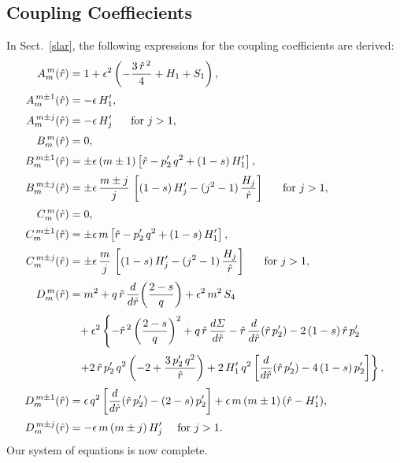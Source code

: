 \documentclass[12pt,prb,aps]{revtex4-1}
\begin{document}
\subsection{Coupling Coeffiecients}
In Sect.~\ref{slar}, the following expressions for the coupling coefficients are derived:
\begin{align}\label{c1}
A_m^{\,m}(\hat{r}) &= 1 + \epsilon^2\left(-\frac{3\,\hat{r}^{\,2}}{4} + H_1+S_1\right),\\[0.5ex]
A_m^{\,m\pm 1}(\hat{r}) &= - \epsilon\,H_1',\\[0.5ex]
A_m^{\,m\pm j}(\hat{r}) &= -\epsilon\,H_j'~~~~~\mbox{for $j>1$},\\[0.5ex]
B_m^{\,m}(\hat{r}) &= 0,\\[0.5ex]
B_m^{\,m\pm 1}(\hat{r}) &= \pm \epsilon\,(m\pm 1)\left[\hat{r}-p_2'\,q^2+(1-s)\,H_1'\right],\\[0.5ex]
B_m^{\,m\pm j}(\hat{r}) &= \pm\epsilon\,\frac{m\pm j}{j}\,\left[(1-s)\,H_j'- (j^2-1)\,\frac{H_j}{\hat{r}}\right]~~~~~\mbox{for $j>1$},\\[0.5ex]
C_m^{\,m}(\hat{r}) &= 0,\\[0.5ex]
C_m^{\,m\pm 1}(\hat{r}) &= \pm \epsilon\,m\left[\hat{r}-p_2'\,q^2+(1-s)\,H_1'\right],\\[0.5ex]
C_m^{\,m\pm j}(\hat{r}) &= \pm\epsilon\,\frac{m}{j}\,\left[(1-s)\,H_j'- (j^2-1)\,\frac{H_j}{\hat{r}}\right]~~~~~\mbox{for $j>1$},\\[0.5ex]
D_m^{\,m}(\hat{r}) &= m^2 + q\,\hat{r}\,\frac{d}{d\hat{r}}\!\left(\frac{2-s}{q}\right) +\epsilon^2\,m^2\,S_4\nonumber\\[0.5ex]
&\phantom{=}+\epsilon^2\left\{-\hat{r}^{\,2}\left(\frac{2-s}{q}\right)^2+q\,\hat{r}\,\frac{d{\mit\Sigma}}{d\hat{r}}- \hat{r}\,\frac{d}{d\hat{r}}(\hat{r}\,p_2') -2\,(1-s)\,\hat{r}\,p_2'
\right.\nonumber\\[0.5ex]
&\phantom{=}\left.+2\,\hat{r}\,p_2'\,q^2\left(-2 + \frac{3\,p_2'\,q^2}{\hat{r}}\right) + 2\,H_1'\,q^2\left[\frac{d}{d\hat{r}}(\hat{r}\,p_2')-4\,(1-s)\,p_2'\right]\right\},\\[0.5ex]
D_m^{\,m\pm 1}(\hat{r}) &=\epsilon\,q^2\left[\frac{d}{d\hat{r}}(\hat{r}\,p_2') - (2-s)\,p_2'\right] + \epsilon\,m\,(m\pm 1)\,(\hat{r}-H_1'),\\[0.5ex]
D_m^{\,m\pm j}(\hat{r}) &= -\epsilon\,m\,(m\pm j)\,H_j'~~~~\mbox{for $j>1$}.\label{cm1}
\end{align}
Our system of equations is now complete. 
\end{document}
